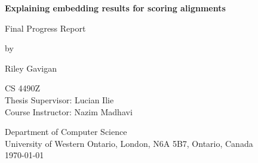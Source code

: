 \begin{titlepage}
        \begin{center}
        \vspace*{1.0cm}

        \Huge
        {\bf Explaining embedding results for scoring alignments }

        \large
        Final Progress Report \\

        \vspace*{1.0cm}

        \normalsize
        by \\

        \vspace*{1.0cm}

        \Large
        Riley Gavigan \\

        \vspace*{3.0cm}

        \normalsize
        CS 4490Z \\
        Thesis Supervisor: Lucian Ilie \\ 
        Course Instructor: Nazim Madhavi \\

        \vspace*{2.0cm}

        Department of Computer Science \\
        University of Western Ontario, London, N6A 5B7, Ontario, Canada \\
        \today \\

        \vspace*{1.0cm}
        \end{center}
\end{titlepage}

\titleformat{\chapter}[display]
  {\normalfont\huge\bfseries}{}{0pt}{\Huge}

\setcounter{page}{2}

\cleardoublepage
{}

\printglossary

\renewcommand*{\abbreviationsname}{Abbreviations}
\printglossary[type=abbreviations]
\cleardoublepage
{}

